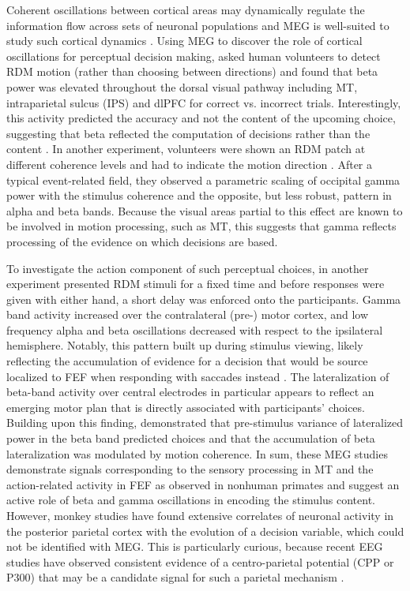 Coherent oscillations between cortical areas may dynamically regulate the information flow across sets of neuronal populations \parencite{Engel2001,Fries2015,Salinas2001,Sejnowski2006,Varela2001} and MEG is well-suited to study such cortical dynamics \parencite{Siegel2011}. Using MEG to discover the role of cortical oscillations for perceptual decision making, \textcite{Donner2007} asked human volunteers to detect RDM motion (rather than choosing between directions) and found that beta power was elevated throughout the dorsal visual pathway including MT, intraparietal sulcus (IPS) and dlPFC for correct vs. incorrect trials. Interestingly, this activity predicted the accuracy and not the content of the upcoming choice, suggesting that beta reflected the computation of decisions rather than the content \parencite[see also][]{Siegel2011}. In another experiment, volunteers were shown an RDM patch at different coherence levels and had to indicate the motion direction \parencite{Siegel2007}. After a typical event-related field, they observed a parametric scaling of occipital gamma power with the stimulus coherence and the opposite, but less robust, pattern in alpha and beta bands. Because the visual areas partial to this effect are known to be involved in motion processing, such as MT, this suggests that gamma reflects processing of the evidence on which decisions are based. 

To investigate the action component of such perceptual choices, in another experiment \textcite{Donner2009} presented RDM stimuli for a fixed time and before responses were given with either hand, a short delay was enforced onto the participants. Gamma band activity increased over the contralateral (pre-) motor cortex, and low frequency alpha and beta oscillations decreased with respect to the ipsilateral hemisphere. Notably, this pattern built up during stimulus viewing, likely reflecting the accumulation of evidence for a decision that would be source localized to FEF when responding with saccades instead \parencite{Herding2017}. The lateralization of beta-band activity over central electrodes in particular appears to reflect an emerging motor plan that is directly associated with participants’ choices. Building upon this finding, \textcite{DeLange2013} demonstrated that pre-stimulus variance of lateralized power in the beta band predicted choices and that the accumulation of beta lateralization was modulated by motion coherence. In sum, these MEG studies demonstrate signals corresponding to the sensory processing in MT and the action-related activity in FEF as observed in nonhuman primates and suggest an active role of beta and gamma oscillations in encoding the stimulus content. However, monkey studies have found extensive correlates of neuronal activity in the posterior parietal cortex with the evolution of a decision variable, which could not be identified with MEG. This is particularly curious, because recent EEG studies have observed consistent evidence of a centro-parietal potential (CPP or P300) that may be a candidate signal for such a parietal mechanism \parencite{Kelly2015}.  

